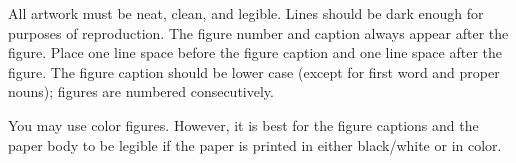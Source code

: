 \documentclass{article}
\begin{document}
All artwork must be neat, clean, and legible. Lines should be dark enough for
purposes of reproduction. The figure number and caption always appear after the
figure. Place one line space before the figure caption and one line space after
the figure. The figure caption should be lower case (except for first word and
proper nouns); figures are numbered consecutively.

You may use color figures.  However, it is best for the figure captions and the
paper body to be legible if the paper is printed in either black/white or in
color.



 
 
\end{document}
